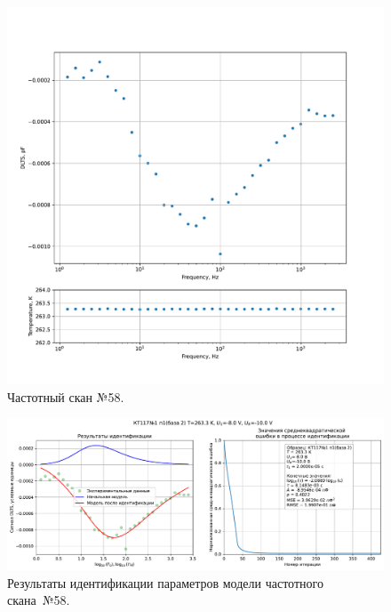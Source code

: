 \begin{figure}[!ht]
    \centering
    \includegraphics[width=1\textwidth]{../plots/КТ117№1_п1(база 2)_2500Гц-1Гц_1пФ_-10С_-8В-10В_20мВ_20мкс_шаг_0,1.pdf}
    \caption{Частотный скан №58.}
    \label{pic:frequency_scan_58}
\end{figure}

\begin{figure}[!ht]
    \centering
    \includegraphics[width=1\textwidth]{../plots/КТ117№1_п1(база 2)_2500Гц-1Гц_1пФ_-10С_-8В-10В_20мВ_20мкс_шаг_0,1_model.pdf}
    \caption{Результаты идентификации параметров модели частотного скана~№58.}
    \label{pic:frequency_scan_model58}
\end{figure}

\pagebreak


